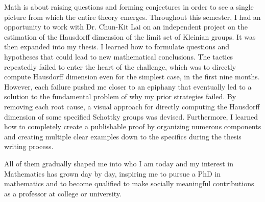 \documentclass[10pt]{amsart}
\begin{document}
Math is about raising questions and forming conjectures in order to see a single picture from which the entire theory emerges. Throughout this semester, I had an opportunity to work with Dr. Chun-Kit Lai on an independent project on the estimation of the Hausdorff dimension of the limit set of Kleinian groups. It was then expanded into my thesis. I learned how to formulate questions and hypotheses that could lead to new mathematical conclusions. The tactics repeatedly failed to enter the heart of the challenge, which was to directly compute Hausdorff dimension even for the simplest case, in the first nine months. However, each failure pushed me closer to an epiphany that eventually led to a solution to the fundamental problem of why my prior strategies failed. By removing each root cause, a visual approach for directly computing the Hausdorff dimension of some specified Schottky groups was devised. Furthermore, I learned how to completely create a publishable proof by organizing numerous components and creating multiple clear examples down to the specifics during the thesis writing process.


All of them gradually shaped me into who I am today and my interest in Mathematics has grown day by day, inspiring me to pursue a PhD in mathematics and to become qualified to make socially meaningful contributions as a professor at college or university.
\end{document}
